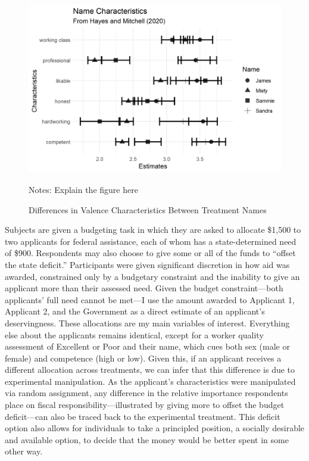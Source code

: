 \documentclass[12pt]{article}%
\begin{document}
\begin{doublespace}
\begin{figure}[h!]
	\centering
	\includegraphics[scale=1]{figs/characteristics.png}
	{\singlespacing
		\parbox{0.78\textwidth}{\scriptsize%
			Notes: Explain the figure here
	}}
	\caption{Differences in Valence Characteristics Between Treatment Names}
	\label{characteristics}
\end{figure}


Subjects are given a budgeting task in which they are asked to allocate \$1,500 to two applicants for federal assistance, each of whom has a state-determined need of \$900. Respondents may also choose to give some or all of the funds to ``offset the state deficit.”  Participants were given significant discretion in how aid was awarded, constrained only by a budgetary constraint and the inability to give an applicant more than their assessed need. Given the budget constraint—both applicants’ full need cannot be met—I use the amount awarded to Applicant 1, Applicant 2, and the Government as a direct estimate of an applicant’s deservingness. These allocations are my main variables of interest. Everything else about the applicants remains identical, except for a worker quality assessment of Excellent or Poor and their name, which cues both sex (male or female) and competence (high or low). Given this, if an applicant receives a different allocation across treatments, we can infer that this difference is due to experimental manipulation. As the applicant’s characteristics were manipulated via random assignment, any difference in the relative importance respondents place on fiscal responsibility—illustrated by giving more to offset the budget deficit—can also be traced back to the experimental treatment. This deficit option also allows for individuals to take a principled position, a socially desirable and available option, to decide that the money would be better spent in some other way.


\end{doublespace}
\end{document}
